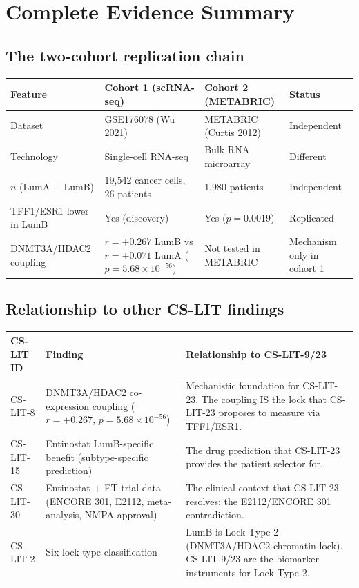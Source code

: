 \documentclass[12pt, a4paper]{article}
\begin{document}
\section{Complete Evidence Summary}

\subsection{The two-cohort replication chain}

\begin{center}
\begin{tabular}{p{3cm}p{3.5cm}p{3.5cm}p{3cm}}
\toprule
\textbf{Feature}
& \textbf{Cohort 1 (scRNA-seq)}
& \textbf{Cohort 2 (METABRIC)}
& \textbf{Status} \\
\midrule
Dataset
& GSE176078 (Wu 2021)
& METABRIC (Curtis 2012)
& Independent \\[0.5em]
Technology
& Single-cell RNA-seq
& Bulk RNA microarray
& Different \\[0.5em]
$n$ (LumA $+$ LumB)
& 19,542 cancer cells,
  26 patients
& 1,980 patients
& Independent \\[0.5em]
TFF1/ESR1 lower in LumB
& Yes (discovery)
& Yes ($p=0.0019$)
& Replicated \\[0.5em]
DNMT3A/HDAC2 coupling
& $r=+0.267$ LumB
  vs $r=+0.071$ LumA
  ($p=5.68\times10^{-56}$)
& Not tested in METABRIC
& Mechanism only in
  cohort 1 \\
\bottomrule
\end{tabular}
\end{center}

\subsection{Relationship to other CS-LIT findings}

\begin{center}
\begin{tabular}{p{2.2cm}p{4.5cm}p{6cm}}
\toprule
\textbf{CS-LIT ID}
& \textbf{Finding}
& \textbf{Relationship to CS-LIT-9/23} \\
\midrule
CS-LIT-8
& DNMT3A/HDAC2 co-expression
  coupling ($r=+0.267$,
  $p=5.68\times10^{-56}$)
& Mechanistic foundation for
  CS-LIT-23. The coupling IS
  the lock that CS-LIT-23
  proposes to measure via
  TFF1/ESR1. \\[0.8em]
CS-LIT-15
& Entinostat LumB-specific
  benefit (subtype-specific
  prediction)
& The drug prediction that
  CS-LIT-23 provides the
  patient selector for. \\[0.8em]
CS-LIT-30
& Entinostat $+$ ET trial
  data (ENCORE 301, E2112,
  meta-analysis, NMPA
  approval)
& The clinical context that
  CS-LIT-23 resolves: the
  E2112/ENCORE 301
  contradiction. \\[0.8em]
CS-LIT-2
& Six lock type
  classification
& LumB is Lock Type 2
  (DNMT3A/HDAC2 chromatin
  lock). CS-LIT-9/23 are
  the biomarker instruments
  for Lock Type 2. \\
\bottomrule
\end{tabular}
\end{center}
\end{document}
